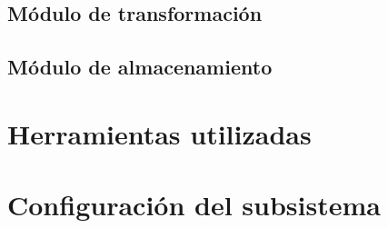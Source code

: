 \subsection{Módulo de transformación}

\subsection{Módulo de almacenamiento}

\section{Herramientas utilizadas}

\section{Configuración del subsistema}


